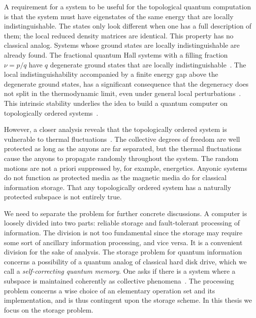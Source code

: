 A requirement for a system to be useful for the topological quantum computation is that the system must have eigenstates of the same energy that are locally indistinguishable. The states only look different when one has a full description of them; the local reduced density matrices are identical. This property has no classical analog. Systems whose ground states are locally indistinguishable are already found. The fractional quantum Hall systems with a filling fraction $\nu = p/q$ have $q$ degenerate ground states that are locally indistinguishable~\cite{Haldane1985MagneticTranslation,WenNiu1990GroundState}. The local indistinguishability accompanied by a finite energy gap above the degenerate ground states, has a significant consequence that the degeneracy does not split in the thermodynamic limit, even under general local perturbations~\cite{WenNiu1990GroundState,Kitaev2003Fault-tolerant,BravyiHastingsMichalakis2010stability}.
This intrinsic stability underlies the idea to build a quantum computer on topologically ordered systems~\cite{
DennisKitaevLandahlEtAl2002Topological,
JiangBrennenGorshkovEtAl2008Anyonic, 
SarmaFreedmanNayak2005Topologically}.



However, a closer analysis reveals that the topologically ordered system is vulnerable to thermal fluctuations~\cite{AlickiFannesHorodecki2009thermalization}. The collective degrees of freedom are well protected as long as the anyons are far separated, but the thermal fluctuations cause the anyons to propagate randomly throughout the system. The random motions are not a priori suppressed by, for example, energetics. Anyonic systems do not function as protected media as the magnetic media do for classical information storage. That any topologically ordered system has a naturally protected subspace is not entirely true.



We need to separate the problem for further concrete discussions. A computer is loosely divided into two parts: reliable storage and fault-tolerant processing of information. The division is not too fundamental since the storage may require some sort of ancillary information processing, and vice versa. It is a convenient division for the sake of analysis. The storage problem for quantum information concerns a possibility of a quantum analog of classical hard disk drive, which we call a \emph{self-correcting quantum memory}. One asks if there is a system where a subspace is maintained coherently as collective phenomena~\cite{DennisKitaevLandahlEtAl2002Topological,Bacon2006Operator}. The processing problem concerns a wise choice of an elementary operation set and its implementation, and is thus contingent upon the storage scheme. In this thesis we focus on the storage problem.


